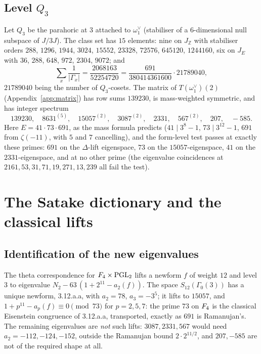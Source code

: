 \documentclass[11pt]{amsart}
\theoremstyle{definition}
\newcommand{\Z}{\mathbb{Z}}\newcommand{\Q}{\mathbb{Q}}\newcommand{\R}{\mathbb{R}}\newcommand{\A}{\mathbb{A}}\newcommand{\F}{\mathbb{F}}
\begin{document}
\subsection{Level $Q_3$} Let $Q_3$ be the parahoric at $3$ attached to $\omega_1^\vee$ (stabiliser of a $6$-dimensional null subspace of $J/3J$). The class set has $15$ elements: nine on $J_\Z$ with stabiliser orders $288$, $1296$, $1944$, $3024$, $15552$, $23328$, $72576$, $645120$, $1244160$, six on $J_E$ with $36$, $288$, $648$, $972$, $2304$, $9072$; and
\[\sum_x\frac1{|\Gamma_x|}=\frac{2068163}{52254720}=\frac{691}{380414361600}\cdot21789040,\]
$21789040$ being the number of $Q_3$-cosets. The matrix of $T(\omega_1^\vee)(2)$ (Appendix~\ref{app:matrix}) has row sums $139230$, is mass-weighted symmetric, and has integer spectrum
\[139230,\quad 8631^{(5)},\quad 15057^{(2)},\quad 3087^{(2)},\quad 2331,\quad 567^{(2)},\quad 207,\quad -585.\]
Here $E=41\cdot73\cdot691$, as the mass formula \cite[(1)]{PartI} predicts ($41\mid3^8-1$, $73\mid3^{12}-1$, $691$ from $\zeta(-11)$, with $5$ and $7$ cancelling), and the form-level test passes at exactly these primes: $691$ on the $\Delta$-lift eigenspace, $73$ on the $15057$-eigenspace, $41$ on the $2331$-eigenspace, and at no other prime (the eigenvalue coincidences at $2161,53,31,71,19,271,13,239$ all fail the test).

\section{The Satake dictionary and the classical lifts}
\subsection{Identification of the new eigenvalues}\label{sec:ident} The theta correspondence for $F_4\times\mathrm{PGL}_2$ \cite{Shan} lifts a newform $f$ of weight $12$ and level $3$ to eigenvalue $N_2-63\,(1+2^{11}-a_2(f))$. The space $S_{12}(\Gamma_0(3))$ has a unique newform, \textsf{3.12.a.a}, with $a_2=78$, $a_3=-3^5$; it lifts to $15057$, and $1+p^{11}-a_p(f)\equiv0\pmod{73}$ for $p=2,5,7$: the prime $73$ on $F_4$ is the classical Eisenstein congruence of \textsf{3.12.a.a}, transported, exactly as $691$ is Ramanujan's. The remaining eigenvalues are \emph{not} such lifts: $3087,2331,567$ would need $a_2=-112,-124,-152$, outside the Ramanujan bound $2\cdot2^{11/2}$, and $207,-585$ are not of the required shape at all.
\end{document}
